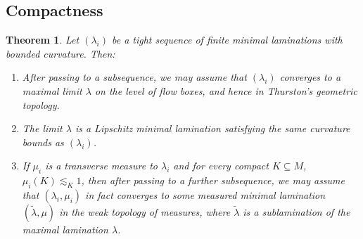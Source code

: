 \documentclass[reqno,11pt]{amsart}
\newtheorem{theorem}{Theorem}[section]
\theoremstyle{definition}
\numberwithin{equation}{section}
\begin{document}
\subsection{Compactness}
\begin{theorem}
Let $(\lambda_i)$ be a tight sequence of finite minimal laminations with bounded curvature. Then:
\begin{enumerate}
\item After passing to a subsequence, we may assume that $(\lambda_i)$ converges to a maximal limit $\lambda$ on the level of flow boxes, and hence in Thurston's geometric topology.
\item The limit $\lambda$ is a Lipschitz minimal lamination satisfying the same curvature bounds as $(\lambda_i)$.
\item If $\mu_i$ is a transverse measure to $\lambda_i$ and for every compact $K \subseteq M$, $\mu_i(K) \lesssim_K 1$, then after passing to a further subsequence, we may assume that $(\lambda_i, \mu_i)$ in fact converges to some measured minimal lamination $(\tilde \lambda, \mu)$ in the weak topology of measures, where $\tilde \lambda$ is a sublamination of the maximal lamination $\lambda$.
\end{enumerate}
\end{theorem}
\end{document}
